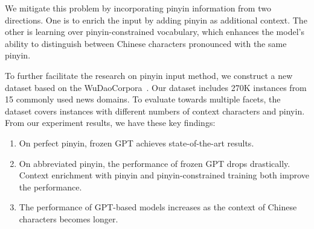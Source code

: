 We mitigate this problem by incorporating pinyin information from two directions.
One is to enrich the input by adding pinyin as additional context.
The other is learning over pinyin-constrained vocabulary, which enhances the model's ability to distinguish between Chinese characters pronounced with the same pinyin. 

To further facilitate the research on pinyin input method, we construct a new dataset based on the WuDaoCorpora~\cite{YUAN202165}.
Our dataset includes 270K instances from 15 commonly used news domains.
To evaluate towards multiple facets, the dataset covers instances with different numbers of context characters and pinyin.
From our experiment results, we have these key findings:
\begin{enumerate}
    \item On {perfect pinyin}, frozen  GPT achieves state-of-the-art results. 
    \item On {abbreviated pinyin}, the performance of frozen GPT drops drastically. 
    Context enrichment with pinyin and  pinyin-constrained training both improve the performance.
    \item The performance of GPT-based models increases as the context of Chinese characters becomes longer.
\end{enumerate}


